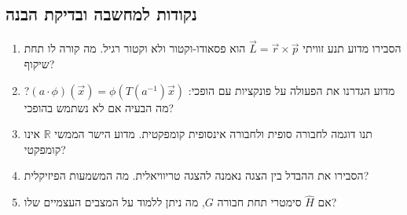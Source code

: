 \subsection*{נקודות למחשבה ובדיקת הבנה}

\begin{enumerate}
    \item הסבירו מדוע תנע זוויתי $\vec{L} = \vec{r} \times \vec{p}$ הוא פסאודו-וקטור ולא וקטור רגיל. מה קורה לו תחת שיקוף?
    
    \item מדוע הגדרנו את הפעולה על פונקציות עם הופכי: $(a \cdot \phi)(\vec{x}) = \phi(T(a^{-1})\vec{x})$? מה הבעיה אם לא נשתמש בהופכי?
    
    \item תנו דוגמה לחבורה סופית ולחבורה אינסופית קומפקטית. מדוע הישר הממשי $\mathbb{R}$ אינו קומפקטי?
    
    \item הסבירו את ההבדל בין הצגה נאמנה להצגה טריוויאלית. מה המשמעות הפיזיקלית?
    
    \item אם $\hat{H}$ סימטרי תחת חבורה $G$, מה ניתן ללמוד על המצבים העצמיים שלו?
\end{enumerate}


